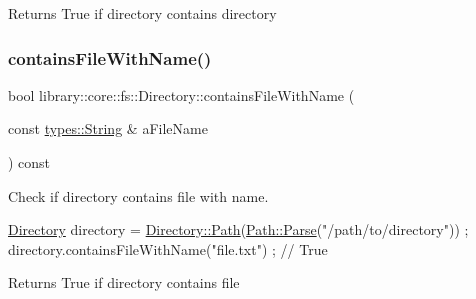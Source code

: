 \begin{DoxyReturn}{Returns}
True if directory contains directory 
\end{DoxyReturn}
\mbox{\label{classlibrary_1_1core_1_1fs_1_1Directory_a0d326fef28dfbb21702a12af9701ed50}} 
\subsubsection{\texorpdfstring{contains\+File\+With\+Name()}{containsFileWithName()}}
{\footnotesize\ttfamily bool library\+::core\+::fs\+::\+Directory\+::contains\+File\+With\+Name (\begin{DoxyParamCaption}\item[{const \hyperlink{classlibrary_1_1core_1_1types_1_1String}{types\+::\+String} \&}]{a\+File\+Name }\end{DoxyParamCaption}) const}



Check if directory contains file with name. 


\begin{DoxyCode}
\hyperlink{classlibrary_1_1core_1_1fs_1_1Directory_a3ec39f6cad19a81d520e9a1f2d8bb1f7}{Directory} directory = \hyperlink{classlibrary_1_1core_1_1fs_1_1Directory_a6d3ea04654841e62a4dbd99feb563caf}{Directory::Path}(\hyperlink{classlibrary_1_1core_1_1fs_1_1Path_aebf5bd3af83e0b7376616e146f3e55df}{Path::Parse}(\textcolor{stringliteral}{"/path/to/directory"}))
       ;
directory.containsFileWithName(\textcolor{stringliteral}{"file.txt"}) ; \textcolor{comment}{// True}
\end{DoxyCode}


\begin{DoxyReturn}{Returns}
True if directory contains file 
\end{DoxyReturn}
\mbox{\label{classlibrary_1_1core_1_1fs_1_1Directory_a7d1bd71d46c8fd653cf237dc3ed5aa00}} 

